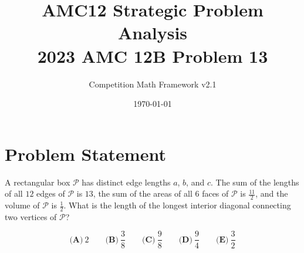 \documentclass[12pt]{article}
\begin{document}
\title{AMC12 Strategic Problem Analysis\\2023 AMC 12B Problem 13}
\author{Competition Math Framework v2.1}
\date{\today}
\maketitle

\section*{Problem Statement}

A rectangular box $\mathcal{P}$ has distinct edge lengths $a$, $b$, and $c$. The sum of the lengths of all $12$ edges of $\mathcal{P}$ is $13$, the sum of the areas of all $6$ faces of $\mathcal{P}$ is $\frac{11}{2}$, and the volume of $\mathcal{P}$ is $\frac{1}{2}$. What is the length of the longest interior diagonal connecting two vertices of $\mathcal{P}$?

$$\textbf{(A)}~2\qquad\textbf{(B)}~\frac{3}{8}\qquad\textbf{(C)}~\frac{9}{8}\qquad\textbf{(D)}~\frac{9}{4}\qquad\textbf{(E)}~\frac{3}{2}$$
\end{document}
